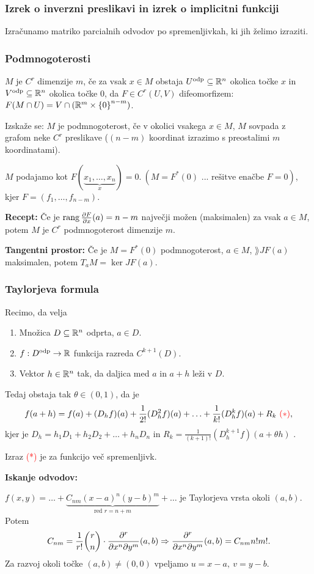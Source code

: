 \subsubsection*{Izrek o inverzni preslikavi in izrek o implicitni funkciji}
Izračunamo matriko parcialnih odvodov po spremenljivkah, ki jih želimo izraziti.

\subsubsection*{Podmnogoterosti}
$M$ je $C^r$  dimenzije $m$, če
za vsak $x \in M$ obstaja $U^\text{odp} \subseteq \mathbb{R}^n$ okolica točke $x$ in $V^\text{odp} \subseteq \mathbb{R}^n$ okolica točke $0$, da $F \in C^r(U, V)$ difeomorfizem: $F(M \cap U) = V \cap (\mathbb{R}^m \times \left\{0\right\}^{n-m})$.

Izskaže se: $M$ je podmnogoterost, če v okolici vsakega $x \in M$, $M$ sovpada z grafom neke $C^r$ preslikave ($(n-m)$ koordinat izrazimo s preostalimi $m$ koordinatami).

$M$ podajamo kot $F(\underbrace{x_1, \ldots, x_n}_x) = 0. \ (M = F^*(0) \text{ ... rešitve enačbe } F = 0)$, kjer $F = (f_1, \ldots, f_{n-m})$.

\textbf{Recept:} Če je $\operatorname{rang} \frac{\partial F}{\partial x}(a) = n-m$ največji možen (maksimalen) za vsak $a \in M$, potem $M$ je $C^r$ podmnogoterost dimenzije $m$.

\textbf{Tangentni prostor:}
Če je $M = F^*(0)$ podmnogoterost, $a \in M$, $\rang JF(a)$ maksimalen, potem $T_aM = \ker JF(a)$.

\subsubsection*{Taylorjeva formula}
\begin{izrek}
    Recimo, da velja
    \begin{enumerate}
        \item Množica $D \subseteq \mathbb{R}^n$ odprta, $a \in D$.
        \item $f: D^{\text{odp}} \to \mathbb{R}$ funkcija razreda $C^{k+1}(D)$.
        \item Vektor $h \in \mathbb{R}^n$ tak, da daljica med $a$ in $a+h$ leži v $D$.
    \end{enumerate}
    Tedaj obstaja tak $\theta \in (0,1)$, da je 
    $$f(a+h) = f(a) + (D_hf)(a) + \frac{1}{2!}(D_h^2f)(a) + \ldots + \frac{1}{k!} (D_h^kf)(a) + R_k \ \textcolor{red}{(*)},$$
    kjer je $D_h = h_1D_1 + h_2D_2 + \ldots + h_nD_n$  in $R_k = \frac{1}{(k+1)!} (D_h^{k+1}f)(a + \theta h)$ .

    Izraz \textcolor{red}{(*)} je  za funkcijo več spremenljivk.
\end{izrek}

\textbf{Iskanje odvodov:}

$f(x,y) = \ldots + \underbrace{C_{nm}(x-a)^n(y-b)^m}_\text{red $r = n+m$} + \ldots$ je Taylorjeva vrsta okoli $(a, b)$. Potem 
$$C_{nm} = \frac{1}{r!} \binom{r}{n} \cdot \frac{\partial^r}{\partial x^n \partial y^m}(a, b) \Rightarrow \frac{\partial^r}{\partial x^n \partial y^m}(a, b) = C_{nm}n!m!.$$
Za razvoj okoli točke $(a,b) \neq (0,0)$ vpeljamo $u = x-a, \ v = y - b$.